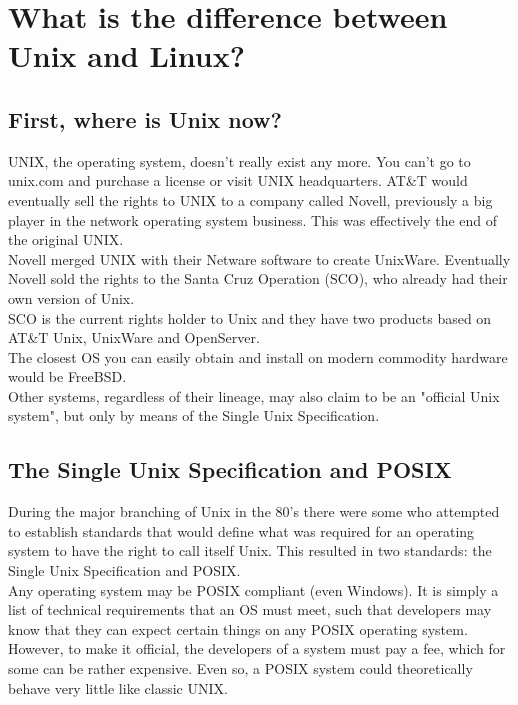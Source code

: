\section{What is the difference between Unix and Linux?}

\subsection{First, where is Unix now?}

UNIX, the operating system, doesn't really exist any more.  You can't go to unix.com and purchase a license or visit UNIX headquarters.  AT\&T would eventually sell the rights to UNIX to a company called Novell, previously a big player in the network operating system business.  This was effectively the end of the original UNIX.\\

Novell merged UNIX with their Netware software to create UnixWare.  Eventually Novell sold the rights to the Santa Cruz Operation (SCO), who already had their own version of Unix.\\

SCO is the current rights holder to Unix and they have two products based on AT\&T Unix, UnixWare and OpenServer.\\

The closest OS you can easily obtain and install on modern commodity hardware would be FreeBSD.\\

Other systems, regardless of their lineage, may also claim to be an "official Unix system", but only by means of the Single Unix Specification.

\subsection{The Single Unix Specification and POSIX}

During the major branching of Unix in the 80's there were some who attempted to establish standards that would define what was required for an operating system to have the right to call itself Unix.  This resulted in two standards: the Single Unix Specification and POSIX.\\

Any operating system may be POSIX compliant (even Windows).  It is simply a list of technical requirements that an OS must meet, such that developers may know that they can expect certain things on any POSIX operating system.  However, to make it official, the developers of a system must pay a fee, which for some can be rather expensive.  Even so, a POSIX system could theoretically behave very little like classic UNIX.\\

